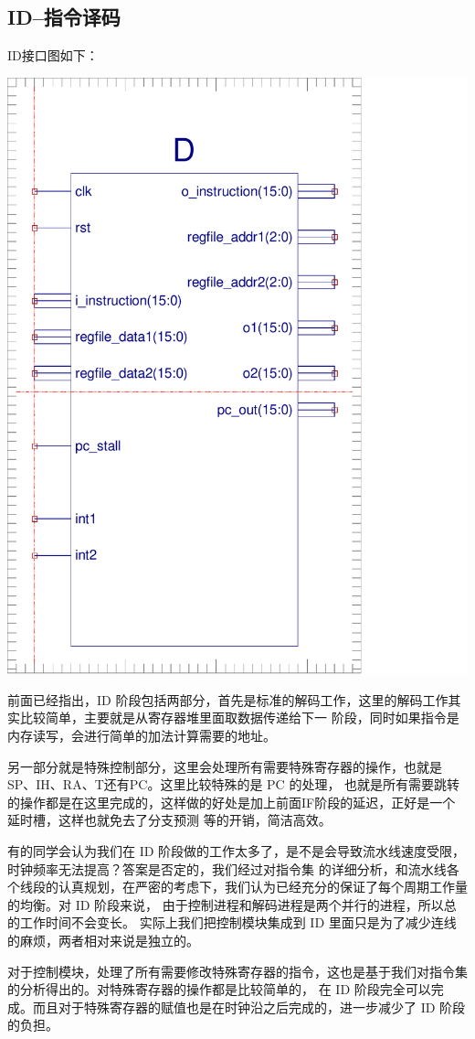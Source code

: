 \documentclass[10pt]{article}
\begin{document}
\begin{CJK}{UTF8}{gbsn}
\subsection{ID--指令译码}
ID接口图如下：\\
\begin{center}
\includegraphics[width=0.5\linewidth]{ID.pdf}
\end{center}
前面已经指出，ID 阶段包括两部分，首先是标准的解码工作，这里的解码工作其实比较简单，主要就是从寄存器堆里面取数据传递给下一
阶段，同时如果指令是内存读写，会进行简单的加法计算需要的地址。

另一部分就是特殊控制部分，这里会处理所有需要特殊寄存器的操作，也就是 SP、IH、RA、T还有PC。这里比较特殊的是  PC 的处理，
也就是所有需要跳转的操作都是在这里完成的，这样做的好处是加上前面IF阶段的延迟，正好是一个延时槽，这样也就免去了分支预测
等的开销，简洁高效。
  
有的同学会认为我们在 ID 阶段做的工作太多了，是不是会导致流水线速度受限，时钟频率无法提高？答案是否定的，我们经过对指令集
的详细分析，和流水线各个线段的认真规划，在严密的考虑下，我们认为已经充分的保证了每个周期工作量的均衡。对 ID 阶段来说，
由于控制进程和解码进程是两个并行的进程，所以总的工作时间不会变长。
实际上我们把控制模块集成到 ID 里面只是为了减少连线的麻烦，两者相对来说是独立的。
   
对于控制模块，处理了所有需要修改特殊寄存器的指令，这也是基于我们对指令集的分析得出的。对特殊寄存器的操作都是比较简单的，
在 ID 阶段完全可以完成。而且对于特殊寄存器的赋值也是在时钟沿之后完成的，进一步减少了 ID 阶段的负担。


\end{CJK}
\end{document}
